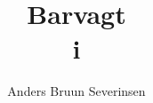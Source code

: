 

\title{Barvagt\\ i \fredagscafeen}
\date{}
\author{Anders Bruun Severinsen}


\maketitle

\tableofcontents











\printindex


